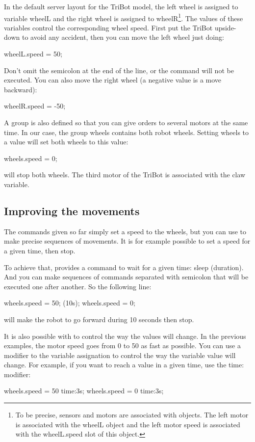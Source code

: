 In the default server layout for the TriBot model, the left wheel is assigned
to variable wheelL and the right wheel is assigned to wheelR\footnote{%
  To be precise, sensors and motors are associated with objects. The left
  motor is associated with the wheelL object and the left motor speed is
  associated with the wheelL.speed slot of this object.
}. The values of these variables control the corresponding wheel
speed. First put the TriBot upside-down to avoid any accident, then you can
move the left wheel just doing:
\begin{urbiunchecked}
  wheelL.speed = 50;
\end{urbiunchecked}

Don't omit the semicolon at the end of the line, or the command will not be
executed. You can also move the right wheel (a negative value is a move
backward):
\begin{urbiunchecked}
  wheelR.speed = -50;
\end{urbiunchecked}

A group is also defined so that you can give orders to several motors at the
same time. In our case, the group wheels contains both robot wheels. Setting
wheels to a value will set both wheels to this value:
\begin{urbiunchecked}
  wheels.speed = 0;
\end{urbiunchecked}

will stop both wheels.
The third motor of the TriBot is associated with the claw variable.

\subsection{Improving the movements}
The commands given so far simply set a speed to the wheels, but you can use
\urbi to make precise sequences of movements. It is for example possible to set
a speed for a given time, then stop.

To achieve that, \urbi provides a command to wait for a given time: sleep
(duration). And you can make sequences of commands separated with semicolon
that will be executed one after another. So the following line:
\begin{urbiunchecked}
  wheels.speed = 50; (10s); wheels.speed = 0;
\end{urbiunchecked}

will make the robot to go forward during 10 seconds then stop.

It is also possible with \urbi to control the way the values will change. In the
previous examples, the motor speed goes from 0 to 50 as fast as possible. You
can use a modifier to the variable assignation to control the way the variable
value will change. For example, if you want to reach a value in a given time,
use the time: modifier:
\begin{urbiunchecked}
  wheels.speed = 50 time:3s; wheels.speed = 0 time:3s;
\end{urbiunchecked}

